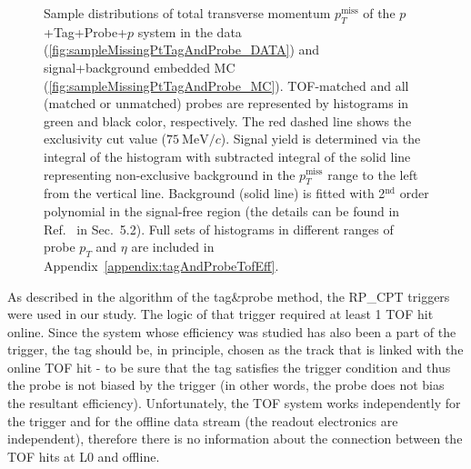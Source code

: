 \begin{figure}[b!]
{\begin{subfigure}[b]{\linewidth}
  \end{subfigure}
}%
\caption[Sample distributions of $p_{T}^{\text{miss}}$ of the $p$+Tag+Probe+$p$ system in the data and embedded MC.]%
    {Sample distributions of total transverse momentum $p_{T}^{\text{miss}}$ of the $p$+Tag+Probe+$p$ system in the data (\ref{fig:sampleMissingPtTagAndProbe_DATA}) and signal+background embedded MC (\ref{fig:sampleMissingPtTagAndProbe_MC}). TOF-matched and all (matched or unmatched) probes are represented by histograms in green and black color, respectively. The red dashed line shows the exclusivity cut value ($75~\text{MeV}/c$). Signal yield is determined via the integral of the histogram with subtracted integral of the solid line representing non-exclusive background in the $p_{T}^{\text{miss}}$ range to the left from the vertical line. Background (solid line) is fitted with 2$^{\text{nd}}$ order polynomial in the signal-free region (the details can be found in Ref.~\cite{AnalysisNoteRafal} in Sec.~5.2). Full sets of histograms in different ranges of probe $p_{T}$ and $\eta$ are included in Appendix~\ref{appendix:tagAndProbeTofEff}.}\label{fig:sampleMissingPtTagAndProbe}%
\end{figure}
\newpage%
%
As described in the algorithm of the tag\&probe method, the RP\_CPT triggers were used in our study. The logic of that trigger required at least 1 TOF hit online. Since the system whose efficiency was studied has also been a part of the trigger, the tag should be, in principle, chosen as the track that is linked with the online TOF hit - to be sure that the tag satisfies the trigger condition and thus the probe is not biased by the trigger (in other words, the probe does not bias the resultant efficiency). Unfortunately, the TOF system works independently for the trigger and for the offline data stream (the readout electronics are independent), therefore there is no information about the connection between the TOF hits at L0 and offline.

